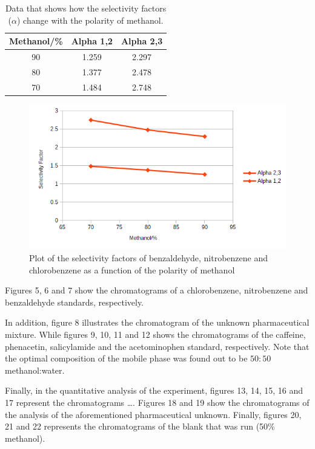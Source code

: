 \documentclass[a4paper, 12pt]{article}
\begin{document}
\begin{table}[h!]
	\centering
	\caption{Data that shows how the selectivity factors ($\alpha$) change with the polarity of methanol.}
	\begin{tabular}{|c|c|c|}
		\hline
		Methanol/\% & Alpha 1,2 & Alpha 2,3 \\
		\hline
		90 & 1.259 & 2.297 \\
		\hline
		80 & 1.377 & 2.478 \\
		\hline
		70 & 1.484 & 2.748 \\
		\hline
	\end{tabular}
	\label{tab-selectivity}
\end{table}

\begin{figure}[h!]
	\centering
	\includegraphics[width=1\textwidth]{fig-selectivity}
	\caption{Plot of the selectivity factors of benzaldehyde, nitrobenzene and chlorobenzene as a function of the polarity of methanol}
	\label{fig-selectivity}
\end{figure}

Figures 5, 6 and 7 show the chromatograms of a chlorobenzene, nitrobenzene and benzaldehyde standards, respectively.

In addition, figure 8 illustrates the chromatogram of the unknown pharmaceutical mixture. While figures 9, 10, 11 and 12 shows the chromatograms of the caffeine, phenacetin, salicylamide and the acetominophen standard, respectively. Note that the optimal composition of the mobile phase was found out to be $50:50$ methanol:water.

Finally, in the quantitative analysis of the experiment, figures 13, 14, 15, 16 and 17 represent the chromatograms \dots{}. Figures 18 and 19 show the chromatograms of the analysis of the aforementioned pharmaceutical unknown. Finally, figures 20, 21 and 22 represents the chromatograms of the blank that was run (50\% methanol).
\end{document}
